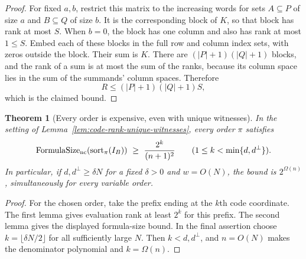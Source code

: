 \documentclass[11pt]{article}
\newtheorem{theorem}{Theorem}[section]
\theoremstyle{definition}
\theoremstyle{remark}
\begin{document}
\begin{proof}
For fixed $a,b$, restrict this matrix to the increasing words for
sets $A\subseteq P$ of size $a$ and $B\subseteq Q$ of size $b$.
It is the corresponding block of $K$, so that block has rank at
most $S$. When $b=0$, the block has one column and also has rank
at most $1\le S$. Embed each of these blocks in the full row and
column index sets, with zeros outside the block. Their sum is
$K$. There are $(|P|+1)(|Q|+1)$ blocks, and the rank of a sum is
at most the sum of the ranks, because its column space lies in the
sum of the summands' column spaces. Therefore
\[
 R\le (|P|+1)(|Q|+1)S,
\]
which is the claimed bound.
\end{proof}

\begin{theorem}[Every order is expensive, even with unique witnesses]
\label{thm:all-orders-code-indicator}
In the setting of Lemma~\ref{lem:code-rank-unique-witnesses}, every
order $\pi$ satisfies
\[
 \operatorname{FormulaSize}_{\rm nc}
       (\operatorname{sort}_{\pi}(I_B))
 \ \ge\ \frac{2^k}{(n+1)^2}
 \qquad (1\le k<\min\{d,d^\perp\}).
\]
In particular, if $d,d^\perp\ge\delta N$ for a fixed
$\delta>0$ and $w=O(N)$, the bound is $2^{\Omega(n)}$,
simultaneously for every variable order.
\end{theorem}
\begin{proof}
For the chosen order, take the prefix ending at the $k$th code
coordinate. The first lemma gives evaluation rank at least $2^k$
for this prefix. The second lemma gives the displayed formula-size
bound. In the final assertion choose
$k=\lfloor\delta N/2\rfloor$ for all sufficiently large $N$.
Then $k<d,d^\perp$, and $n=O(N)$ makes the denominator polynomial
and $k=\Omega(n)$.
\end{proof}
\end{document}
